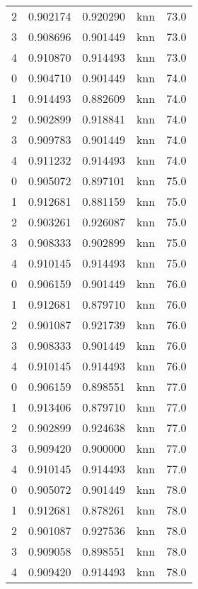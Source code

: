 \begin{tabular}{rrrlr}
     2 & 0.902174 & 0.920290 &      knn &       73.0 \\
     3 & 0.908696 & 0.901449 &      knn &       73.0 \\
     4 & 0.910870 & 0.914493 &      knn &       73.0 \\
     0 & 0.904710 & 0.901449 &      knn &       74.0 \\
     1 & 0.914493 & 0.882609 &      knn &       74.0 \\
     2 & 0.902899 & 0.918841 &      knn &       74.0 \\
     3 & 0.909783 & 0.901449 &      knn &       74.0 \\
     4 & 0.911232 & 0.914493 &      knn &       74.0 \\
     0 & 0.905072 & 0.897101 &      knn &       75.0 \\
     1 & 0.912681 & 0.881159 &      knn &       75.0 \\
     2 & 0.903261 & 0.926087 &      knn &       75.0 \\
     3 & 0.908333 & 0.902899 &      knn &       75.0 \\
     4 & 0.910145 & 0.914493 &      knn &       75.0 \\
     0 & 0.906159 & 0.901449 &      knn &       76.0 \\
     1 & 0.912681 & 0.879710 &      knn &       76.0 \\
     2 & 0.901087 & 0.921739 &      knn &       76.0 \\
     3 & 0.908333 & 0.901449 &      knn &       76.0 \\
     4 & 0.910145 & 0.914493 &      knn &       76.0 \\
     0 & 0.906159 & 0.898551 &      knn &       77.0 \\
     1 & 0.913406 & 0.879710 &      knn &       77.0 \\
     2 & 0.902899 & 0.924638 &      knn &       77.0 \\
     3 & 0.909420 & 0.900000 &      knn &       77.0 \\
     4 & 0.910145 & 0.914493 &      knn &       77.0 \\
     0 & 0.905072 & 0.901449 &      knn &       78.0 \\
     1 & 0.912681 & 0.878261 &      knn &       78.0 \\
     2 & 0.901087 & 0.927536 &      knn &       78.0 \\
     3 & 0.909058 & 0.898551 &      knn &       78.0 \\
     4 & 0.909420 & 0.914493 &      knn &       78.0 \\

\end{tabular}
